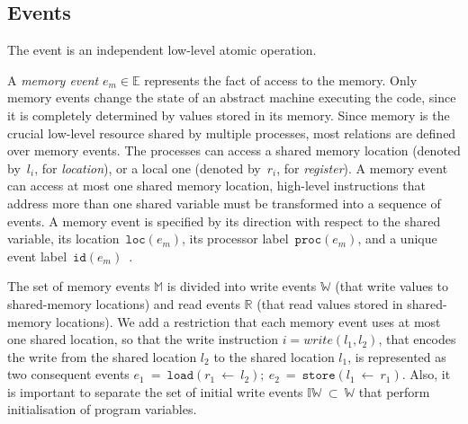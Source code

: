 

\subsection{Events}
\label{ch:wmm:model:events}



The event is an independent low-level atomic operation.

A \textit{memory event} $e_m \in \mathbb{E}$ represents the fact of access to the memory.
Only memory events change the state of an abstract machine executing the code, since it is completely determined by values stored in its memory.
Since memory is the crucial low-level resource shared by multiple processes, most relations are defined over memory events. 
The processes can access a shared memory location (denoted by~$l_i$, for \textit{location}), or a local one (denoted by~$r_i$, for \textit{register}).
A memory event can access at most one shared memory location, high-level instructions that address more than one shared variable must be transformed into a sequence of events.
A memory event is specified by its direction with respect to the shared variable, its location~$\mathtt{loc}(e_m)$, its processor label~$\mathtt{proc}(e_m)$, and a unique event label~$\mathtt{id}(e_m)$~\cite{alglave2010shared}.

The set of memory events $\mathbb{M}$ is divided into write events $\mathbb{W}$ (that write values to shared-memory locations) and read events $\mathbb{R}$ (that read values stored in shared-memory locations).
We add a restriction that each memory event uses at most one shared location, so that the write instruction $i = write(l_1, l_2)$, that encodes the write from the shared location $l_2$ to the shared location $l_1$, is represented as two consequent events $e_1~=~\mathtt{load}(r_1~\leftarrow~l_2); \ e_2~=~\mathtt{store}(l_1~\leftarrow~r_1)$.
Also, it is important to separate the set of initial write events $\mathbb{IW}~\subset~\mathbb{W}$ that perform initialisation of program variables.

